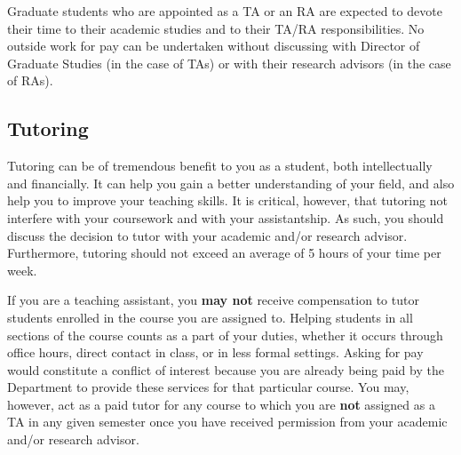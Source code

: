 Graduate students who are appointed as a TA
or an RA are expected to devote their time to their academic studies
and to their TA/RA responsibilities. No outside work for pay can be
undertaken without discussing with Director of Graduate Studies (in
the case of TAs) or with their research advisors (in the case of RAs).

\subsection{Tutoring}

Tutoring can be of tremendous benefit to you as a student, both
intellectually and financially.  It can help you gain a better
understanding of your field, and also help you to improve your
teaching skills.  It is critical, however, that tutoring not interfere
with your coursework and with your assistantship.  As such, you should
discuss the decision to tutor with your academic and/or research
advisor.  Furthermore, tutoring should not exceed an average of 5
hours of your time per week.

If you are a teaching assistant, you \textbf{may not} receive
compensation to tutor students enrolled in the course you are assigned
to.  Helping students in all sections of the course counts as a part
of your duties, whether it occurs through office hours, direct contact
in class, or in less formal settings.  Asking for pay would constitute
a conflict of interest because you are already being paid by the
Department to provide these services for that particular course.  You
may, however, act as a paid tutor for any course to which you are
\textbf{not} assigned as a TA in any given semester once you have
received permission from your academic and/or research advisor.
